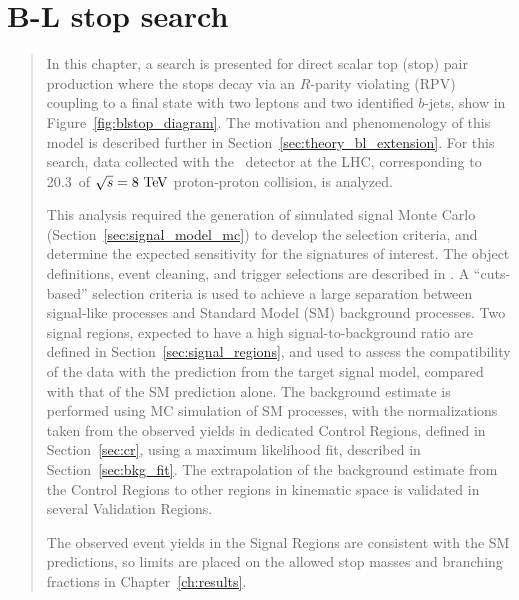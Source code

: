\chapter[B-L stop search][B-L stop search]{B-L stop search}
\label{ch:bl_stop}

\begin{quote}
  In this chapter, a search is presented for direct scalar top (stop) pair
  production where the stops decay via an $R$-parity violating (RPV) coupling to
  a final state with two leptons and two identified $b$-jets, show in
  Figure~\ref{fig:blstop_diagram}.
  The motivation and phenomenology of this model is described further in
  Section~\ref{sec:theory_bl_extension}.
  For this search, data collected with the \atlas\ detector at the LHC,
  corresponding to 20.3~\ifb of $\sqrt{s} = 8\TeV$ proton-proton collision, is
  analyzed.

  This analysis required the generation of simulated signal Monte Carlo 
  (Section~\ref{sec:signal_model_mc}) to develop the selection criteria, and
  determine the expected sensitivity for the signatures of interest.
  The object definitions, event cleaning, and trigger selections are described in
  .
  A ``cuts-based'' selection criteria is used to achieve a large separation between
  signal-like processes and Standard Model (SM) background processes.
  Two signal regions, expected to have a high signal-to-background ratio are
  defined in Section~\ref{sec:signal_regions}, and used to assess the
  compatibility of the data with the prediction from the target signal model,
  compared with that of the SM prediction alone.
  The background estimate is performed using MC simulation of SM processes, with
  the normalizations taken from the observed yields in dedicated Control Regions,
  defined in Section~\ref{sec:cr}, using a maximum likelihood fit, described in
  Section~\ref{sec:bkg_fit}.
  The extrapolation of the background estimate from the Control Regions to other
  regions in kinematic space is validated in several Validation Regions.

  The observed event yields in the Signal Regions are consistent with the SM
  predictions, so limits are placed on the allowed stop masses and branching
  fractions in Chapter~\ref{ch:results}.
\end{quote}

